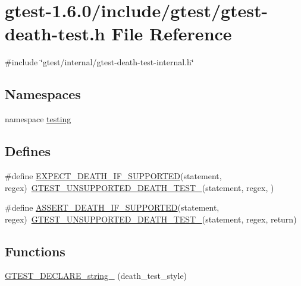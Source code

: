 \hypertarget{gtest-death-test_8h}{\section{gtest-\/1.6.0/include/gtest/gtest-\/death-\/test.h \-File \-Reference}
\label{d4/d59/gtest-death-test_8h}
}
{\ttfamily \#include \char`\"{}gtest/internal/gtest-\/death-\/test-\/internal.\-h\char`\"{}}\*
\subsection*{\-Namespaces}
\begin{DoxyCompactItemize}
\item 
namespace \hyperlink{namespacetesting}{testing}
\end{DoxyCompactItemize}
\subsection*{\-Defines}
\begin{DoxyCompactItemize}
\item 
\#define \hyperlink{gtest-death-test_8h_a8564de0e012dd0898949c513d1571f8b}{\-E\-X\-P\-E\-C\-T\-\_\-\-D\-E\-A\-T\-H\-\_\-\-I\-F\-\_\-\-S\-U\-P\-P\-O\-R\-T\-E\-D}(statement, regex)~\hyperlink{gtest-death-test-internal_8h_a29a145cda8bd2d0c6a78b0ac1d670d18}{\-G\-T\-E\-S\-T\-\_\-\-U\-N\-S\-U\-P\-P\-O\-R\-T\-E\-D\-\_\-\-D\-E\-A\-T\-H\-\_\-\-T\-E\-S\-T\-\_\-}(statement, regex, )
\item 
\#define \hyperlink{gtest-death-test_8h_ab2f0f25b46353767179a49ebd15b7345}{\-A\-S\-S\-E\-R\-T\-\_\-\-D\-E\-A\-T\-H\-\_\-\-I\-F\-\_\-\-S\-U\-P\-P\-O\-R\-T\-E\-D}(statement, regex)~\hyperlink{gtest-death-test-internal_8h_a29a145cda8bd2d0c6a78b0ac1d670d18}{\-G\-T\-E\-S\-T\-\_\-\-U\-N\-S\-U\-P\-P\-O\-R\-T\-E\-D\-\_\-\-D\-E\-A\-T\-H\-\_\-\-T\-E\-S\-T\-\_\-}(statement, regex, return)
\end{DoxyCompactItemize}
\subsection*{\-Functions}
\begin{DoxyCompactItemize}
\item 
\hyperlink{namespacetesting_a01dc67468f68811e10b5feab417f8220}{\-G\-T\-E\-S\-T\-\_\-\-D\-E\-C\-L\-A\-R\-E\-\_\-string\-\_\-} (death\-\_\-test\-\_\-style)
\end{DoxyCompactItemize}


